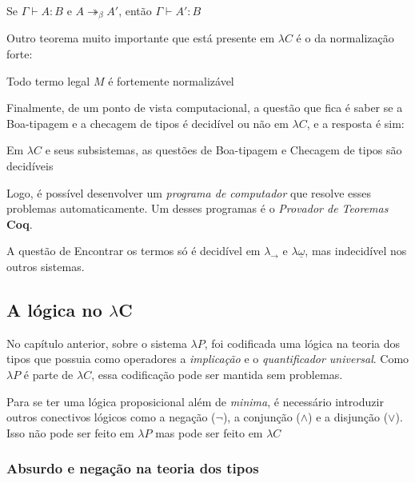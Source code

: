 \documentclass[../main.tex]{subfiles}
\begin{document}
\begin{lemma}
    Se $\Gamma \vdash A : B$ e $A \twoheadrightarrow_{\beta} A'$, então $\Gamma \vdash A' : B$
\end{lemma}

Outro teorema muito importante que está presente em $\lambda C$ é o da normalização forte:

\begin{theorem}
    Todo termo legal $M$ é fortemente normalizável
\end{theorem}

Finalmente, de um ponto de vista computacional, a questão que fica é saber se a Boa-tipagem e a checagem de tipos é decidível ou não em $\lambda C$, e a resposta é sim:

\begin{theorem}
    Em $\lambda C$ e seus subsistemas, as questões de Boa-tipagem e Checagem de tipos são decidíveis
\end{theorem}

Logo, é possível desenvolver um \emph{programa de computador} que resolve esses problemas automaticamente. Um desses programas é o \emph{Provador de Teoremas} \textbf{Coq}.

A questão de Encontrar os termos só é decidível em $\lambda_{\to}$ e $\lambda \underline{\omega}$, mas indecidível nos outros sistemas.

\subsection{A lógica no \texorpdfstring{$\lambda$C}{LC}}

No capítulo anterior, sobre o sistema $\lambda P$, foi codificada uma lógica na teoria dos tipos que possuia como operadores a \emph{implicação} e o \emph{quantificador universal}. Como $\lambda P$ é parte de $\lambda C$, essa codificação pode ser mantida sem problemas.

Para se ter uma lógica proposicional além de \emph{minima}, é necessário introduzir outros conectivos lógicos como a negação ($\neg$), a conjunção ($\wedge$) e a disjunção ($\vee$). Isso não pode ser feito em $\lambda P$ mas pode ser feito em $\lambda C$

\subsubsection{Absurdo e negação na teoria dos tipos}
\end{document}
